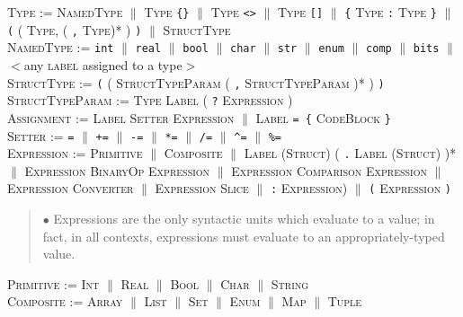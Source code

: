 \documentclass{article}
\newcommand{\code}[1]{\colorbox{light-gray}{\texttt{#1}}}
\begin{document}
\textsc{Type} := \textsc{NamedType} $\|$ \textsc{Type} \code{\{\}} $\|$ \textsc{Type} \code{<>} $\|$ \textsc{Type} \code{[]} $\|$ \code{\{} \textsc{Type} \code{:} \textsc{Type} \code{\}} $\|$ \code{(} ( \textsc{Type}, ( \code{,} \textsc{Type})* ) \code{)} $\|$ \textsc{StructType} \\

\textsc{NamedType} := \code{int} $\|$ \code{real} $\|$ \code{bool} $\|$ \code{char} $\|$ \code{str} $\|$ \code{enum} $\|$ \code{comp} $\|$ \code{bits} $\|$ $<$any \textsc{label} assigned to a type$>$ \\

\textsc{StructType} := \code{(} ( \textsc{StructTypeParam} ( \code{,} \textsc{StructTypeParam} )* ) \code{)} \\

\textsc{StructTypeParam} := \textsc{Type} \textsc{Label} ( \code{?} \textsc{Expression} ) \\

\textsc{Assignment} := \textsc{Label} \textsc{Setter} \textsc{Expression} $\|$ \textsc{Label} \code{= \{} \textsc{CodeBlock} \code{\}} \\

\textsc{Setter} := \code{=} $\|$ \code{+=} $\|$ \code{-=} $\|$ \code{*=} $\|$ \code{/=} $\|$ \code{\^{}=} $\|$ \code{\%=} \\

\textsc{Expression} := \textsc{Primitive} $\|$ \textsc{Composite} $\|$ \textsc{Label} (\textsc{Struct}) ( \code{.} \textsc{Label} (\textsc{Struct}) )* $\|$ \textsc{Expression} \textsc{BinaryOp} \textsc{Expression} $\|$ \textsc{Expression} \textsc{Comparison} \textsc{Expression} $\|$ \textsc{Expression} \textsc{Converter} $\|$ \textsc{Expression} \textsc{Slice} $\|$ \code{:} \textsc{Expression}) $\|$ \code{(} \textsc{Expression} \code{)}

\begin{quote} $\bullet$ Expressions are the only syntactic units which evaluate to a value; in fact, in all contexts, expressions must evaluate to an appropriately-typed value. \end{quote}

\textsc{Primitive} := \textsc{Int} $\|$ \textsc{Real} $\|$ \textsc{Bool} $\|$ \textsc{Char} $\|$ \textsc{String} \\

\textsc{Composite} := \textsc{Array} $\|$ \textsc{List} $\|$ \textsc{Set} $\|$ \textsc{Enum} $\|$ \textsc{Map} $\|$ \textsc{Tuple} \\
\end{document}
